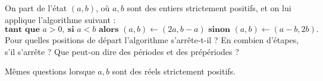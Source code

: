 On part de l'état $(a, b)$, où $a, b$ sont des entiers strictement positifs, et on lui applique l'algorithme suivant :
\[ \textbf{tant que } a > 0,\ \textbf{si } a < b \textbf{ alors } (a, b) \leftarrow (2a, b - a) \textbf{ sinon } (a, b) \leftarrow (a - b, 2b). \]
Pour quelles positions de départ l'algorithme s'arrête-t-il ? En combien d'étapes, s'il s'arrête ? Que peut-on dire des périodes et des prépériodes ?

Mêmes questions lorsque $a, b$ sont des réels strictement positifs.
